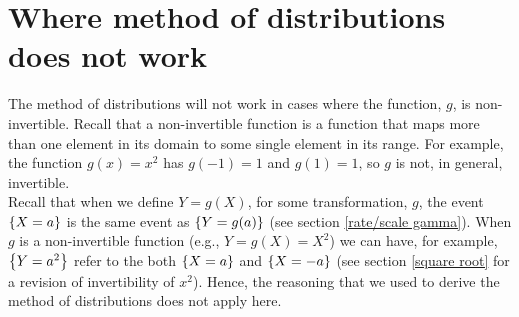 \section{Where method of distributions does not work} \label{where md not work}
The method of distributions will not work in cases where the function, $g$, is non-invertible. Recall that a non-invertible function is a function that maps more than one element in its domain to some single element in its range. For example, the function $g(x) = x^2$ has $g(-1) = 1$ and $g(1) = 1$, so $g$ is not, in general, invertible. \\

\noindent Recall that when we define $Y = g(X)$, for some transformation, $g$, the event $\left\{X = a\right\}$ is the same event as $\left\{Y = g(a)\right\}$ (see section \ref{rate/scale gamma}). When $g$ is a non-invertible function (e.g., $Y = g(X) = X^2$) we can have, for example, $\left\{Y = a^2\right\}$ refer to the both $\left\{X = a\right\}$ and $\left\{X = -a\right\}$ (see section \ref{square root} for a revision of invertibility of $x^2$). Hence, the reasoning that we used to derive the method of distributions does not apply here. \\

